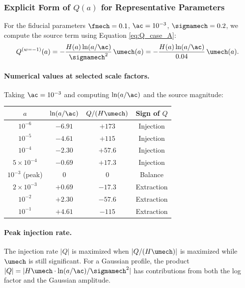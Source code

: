 \subsubsection{Explicit Form of $Q(a)$ for Representative Parameters}

For the fiducial parameters $\fmech = 0.1$, $\ac = 10^{-3}$, $\sigmamech = 0.2$, we compute the source term using Equation \eqref{eq:Q_case_A}:
\begin{equation}
Q^{(w=-1)}(a) = -\frac{H(a)\ln(a/\ac)}{\sigmamech^2} \, \umech(a) = -\frac{H(a)\ln(a/\ac)}{0.04} \, \umech(a).
\end{equation}

\paragraph{Numerical values at selected scale factors.}

Taking $\ac = 10^{-3}$ and computing $\ln(a/\ac)$ and the source magnitude:

\begin{center}
\begin{tabular}{c|c|c|c}
\toprule
$a$ & $\ln(a/\ac)$ & $Q/(H\umech)$ & Sign of $Q$ \\
\midrule
$10^{-6}$ & $-6.91$ & $+173$ & Injection \\
$10^{-5}$ & $-4.61$ & $+115$ & Injection \\
$10^{-4}$ & $-2.30$ & $+57.6$ & Injection \\
$5\times 10^{-4}$ & $-0.69$ & $+17.3$ & Injection \\
$10^{-3}$ (peak) & $0$ & $0$ & Balance \\
$2\times 10^{-3}$ & $+0.69$ & $-17.3$ & Extraction \\
$10^{-2}$ & $+2.30$ & $-57.6$ & Extraction \\
$10^{-1}$ & $+4.61$ & $-115$ & Extraction \\
\bottomrule
\end{tabular}
\end{center}

\paragraph{Peak injection rate.}

The injection rate $|Q|$ is maximized when $|Q/(H\umech)|$ is maximized while $\umech$ is still significant. For a Gaussian profile, the product $|Q| = |H\umech \cdot \ln(a/\ac)/\sigmamech^2|$ has contributions from both the log factor and the Gaussian amplitude.

